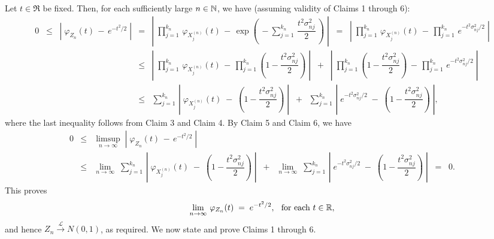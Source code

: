 \vskip 0.5cm
\noindent
Let $t \in \Re$ be fixed. Then, for each sufficiently large $n \in \N$,
we have (assuming validity of Claims 1 through 6):
\begin{eqnarray*}
0 \;\; \leq \;\;
\left\vert\; \varphi_{Z_{n}}(t) \, - \, e^{-t^{2}/2} \;\right\vert
&=&
\left\vert\;
\prod_{j=1}^{k_{n}}\,\varphi_{X^{(n)}_{j}}(t)
\, - \, \exp\left(\,-\sum_{j=1}^{k_{n}}\,\dfrac{t^{2}\sigma^{2}_{nj}}{2}\,\right)
\;\right\vert
\;\;=\;\;
\left\vert\;
\prod_{j=1}^{k_{n}}\,\varphi_{X^{(n)}_{j}}(t)
\, - \, \prod_{j=1}^{k_{n}}\,e^{-t^{2}\sigma^{2}_{nj}/2}
\;\right\vert
\\
&\leq&
\left\vert\;
\prod_{j=1}^{k_{n}}\,\varphi_{X^{(n)}_{j}}(t)
\, - \, 
\prod_{j=1}^{k_{n}}\left(1 - \dfrac{t^{2}\sigma^{2}_{nj}}{2}\right)
\;\right\vert
\;\; + \;\;
\left\vert\;
\prod_{j=1}^{k_{n}}\left(1 - \dfrac{t^{2}\sigma^{2}_{nj}}{2}\right)
\, - \,
\prod_{j=1}^{k_{n}}\,e^{-t^{2}\sigma^{2}_{nj}/2}
\;\right\vert
\\
&\leq&
\sum_{j=1}^{k_{n}}\,
\left\vert\;\varphi_{X^{(n)}_{j}}(t) \; - \; \left(1 - \dfrac{t^{2}\sigma^{2}_{nj}}{2}\right)\;\right\vert
\;\; + \;\;
\sum_{j=1}^{k_{n}}\,
\left\vert\; e^{-t^{2}\sigma^{2}_{nj}/2} \; - \; \left(1 - \dfrac{t^{2}\sigma^{2}_{nj}}{2}\right)\;\right\vert,
\end{eqnarray*}
where the last inequality follows from Claim 3 and Claim 4.
By Claim 5 and Claim 6, we have
\begin{eqnarray*}
0 & \leq &
\limsup_{n\rightarrow\infty}\;\left\vert\; \varphi_{Z_{n}}(t) \, - \, e^{-t^{2}/2} \;\right\vert
\\
&\leq&
\lim_{n\rightarrow\infty}\;
\sum_{j=1}^{k_{n}}\,
\left\vert\;\varphi_{X^{(n)}_{j}}(t) \; - \; \left(1 - \dfrac{t^{2}\sigma^{2}_{nj}}{2}\right)\;\right\vert
\;\; + \;\;
\lim_{n\rightarrow\infty}\;
\sum_{j=1}^{k_{n}}\,
\left\vert\; e^{-t^{2}\sigma^{2}_{nj}/2} \; - \; \left(1 - \dfrac{t^{2}\sigma^{2}_{nj}}{2}\right)\;\right\vert
\;\;=\;\; 0.
\end{eqnarray*}
This proves
\begin{equation*}
\lim_{n\rightarrow\infty}\, \varphi_{Z_{n}}(t) \; = \; e^{-t^{2}/2},
\;\;\,
\textnormal{for each $t \in \Re$},
\end{equation*}
and hence $Z_{n} \overset{\mathcal{L}}{\longrightarrow} N(0,1)$,
as required. We now state and prove Claims 1 through 6.

